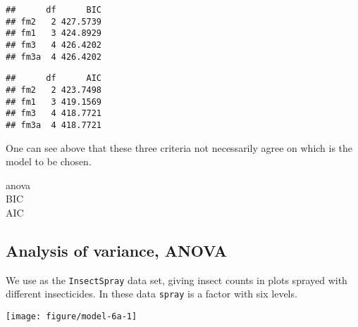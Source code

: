 \begin{knitrout}
\color{fgcolor}\begin{kframe}
\begin{alltt}
\end{alltt}
\begin{verbatim}
##      df      BIC
## fm2   2 427.5739
## fm1   3 424.8929
## fm3   4 426.4202
## fm3a  4 426.4202
\end{verbatim}
\begin{alltt}
\end{alltt}
\begin{verbatim}
##      df      AIC
## fm2   2 423.7498
## fm1   3 419.1569
## fm3   4 418.7721
## fm3a  4 418.7721
\end{verbatim}
\end{kframe}
\end{knitrout}

One can see above that these three criteria not necessarily agree on which is the model to be chosen.

\begin{description}
\item[anova] 
\item[BIC] 
\item[AIC] 
\end{description}

\subsection{Analysis of variance, ANOVA}\label{sec:anova}

We use as the \texttt{InsectSpray} data set, giving insect counts in plots sprayed with different insecticides. In these data \texttt{spray} is a factor with six levels.

\begin{knitrout}
\color{fgcolor}\begin{kframe}
\begin{alltt}
 \hlkwb{<-}  \hlopt{~}   
\end{alltt}
\end{kframe}
\end{knitrout}

\begin{knitrout}
\color{fgcolor}\begin{kframe}
\begin{alltt}
  \hlstd{=} \hlstd{)}
\end{alltt}
\end{kframe}
\texttt{[image: figure/model-6a-1]} 

\end{knitrout}

